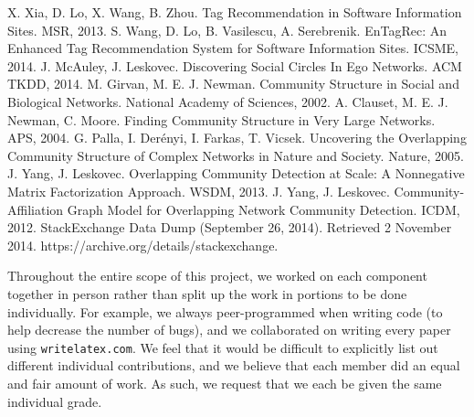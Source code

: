\documentclass[10pt]{IEEEtran}
\begin{document}
\begin{thebibliography}{1}
 X. Xia, D. Lo, X. Wang, B. Zhou. Tag Recommendation in Software Information Sites. MSR, 2013.
 S. Wang, D. Lo, B. Vasilescu, A. Serebrenik. EnTagRec: An Enhanced Tag Recommendation System for Software Information Sites. ICSME, 2014.
 J. McAuley, J. Leskovec. Discovering Social Circles In Ego Networks. ACM TKDD, 2014.
 M. Girvan, M. E. J. Newman. Community Structure in Social and Biological Networks. National Academy of Sciences, 2002.
 A. Clauset, M. E. J. Newman, C. Moore. Finding Community Structure in Very Large Networks. APS, 2004.
 G. Palla, I. Der\'{e}nyi, I. Farkas, T. Vicsek. Uncovering the Overlapping Community Structure of Complex Networks in Nature and Society. Nature, 2005.
 J. Yang, J. Leskovec. Overlapping Community Detection at Scale: A Nonnegative Matrix Factorization Approach. WSDM, 2013.
 J. Yang, J. Leskovec. Community-Affiliation Graph Model for Overlapping Network Community Detection. ICDM, 2012.
 StackExchange Data Dump (September 26, 2014). Retrieved 2 November 2014. https://archive.org/details/stackexchange.
\end{thebibliography}

\appendix

Throughout the entire scope of this project, we worked on each component together in person rather than split up the work in portions to be done individually. For example, we always peer-programmed when writing code (to help decrease the number of bugs), and we collaborated on writing every paper using \texttt{writelatex.com}. We feel that it would be difficult to explicitly list out different individual contributions, and we believe that each member did an equal and fair amount of work. As such, we request that we each be given the same individual grade.

\end{document}
